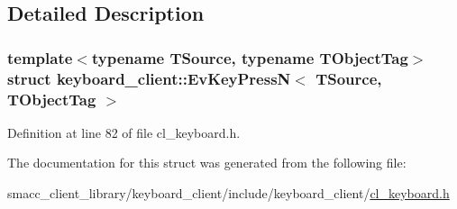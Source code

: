 \subsection{Detailed Description}
\subsubsection*{template$<$typename T\+Source, typename T\+Object\+Tag$>$\newline
struct keyboard\+\_\+client\+::\+Ev\+Key\+Press\+N$<$ T\+Source, T\+Object\+Tag $>$}



Definition at line 82 of file cl\+\_\+keyboard.\+h.



The documentation for this struct was generated from the following file\+:\begin{DoxyCompactItemize}
\item 
smacc\+\_\+client\+\_\+library/keyboard\+\_\+client/include/keyboard\+\_\+client/\hyperlink{cl__keyboard_8h}{cl\+\_\+keyboard.\+h}\end{DoxyCompactItemize}
